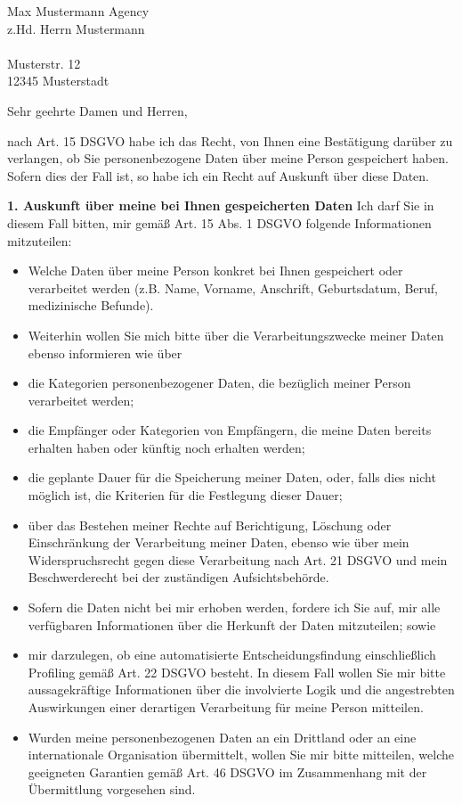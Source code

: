 \documentclass[a4paper, pagenumber=footmiddle, parskip=half,
	foldmarks=true,foldmarks=BmT,
	fromalign=right,  %
	fromphone=false, fromfax=false, fromemail=true, fromurl=true, fromlogo=true,
	fromrule=false, version=last]{scrlttr2}
\begin{document}
\begin{letter}{
	Max Mustermann Agency\\ 
	z.Hd. Herrn Mustermann\\ \ \\
	Musterstr. 12\\
	12345 Musterstadt
}
\flushleft
\opening{Sehr geehrte Damen und Herren,}

nach Art. 15 DSGVO habe ich das Recht, von Ihnen eine Bestätigung darüber zu verlangen, ob Sie personenbezogene Daten über meine Person gespeichert haben. Sofern dies der Fall ist, so habe ich ein Recht auf Auskunft über diese Daten.

\textbf{1. Auskunft über meine bei Ihnen gespeicherten Daten}
Ich darf Sie in diesem Fall bitten, mir gemäß Art. 15 Abs. 1 DSGVO folgende Informationen mitzuteilen:

\begin{itemize} 
	\item Welche Daten über meine Person konkret bei Ihnen gespeichert oder verarbeitet werden (z.B. Name, Vorname, Anschrift, Geburtsdatum, Beruf, medizinische Befunde).
	\item Weiterhin wollen Sie mich bitte über die Verarbeitungszwecke meiner Daten ebenso informieren wie über
	\item die Kategorien personenbezogener Daten, die bezüglich meiner Person verarbeitet werden;
	\item die Empfänger oder Kategorien von Empfängern, die meine Daten bereits erhalten haben oder künftig noch erhalten werden;
	\item die geplante Dauer für die Speicherung meiner Daten, oder, falls dies nicht möglich ist, die Kriterien für die Festlegung dieser Dauer;
	\item über das Bestehen meiner Rechte auf Berichtigung, Löschung oder Einschränkung der Verarbeitung meiner Daten, ebenso wie über mein Widerspruchsrecht gegen diese Verarbeitung nach Art. 21 DSGVO und mein Beschwerderecht bei der zuständigen Aufsichtsbehörde.
	\item Sofern die Daten nicht bei mir erhoben werden, fordere ich Sie auf, mir alle verfügbaren Informationen über die Herkunft der Daten mitzuteilen; sowie
	\item mir darzulegen, ob eine automatisierte Entscheidungsfindung einschließlich Profiling gemäß Art. 22 DSGVO besteht. In diesem Fall wollen Sie mir bitte aussagekräftige Informationen über die involvierte Logik und die angestrebten Auswirkungen einer derartigen Verarbeitung für meine Person mitteilen.
	\item Wurden meine personenbezogenen Daten an ein Drittland oder an eine internationale Organisation übermittelt, wollen Sie mir bitte mitteilen, welche geeigneten Garantien gemäß Art. 46 DSGVO im Zusammenhang mit der Übermittlung vorgesehen sind.
\end{itemize}


\end{letter}
\end{document}
